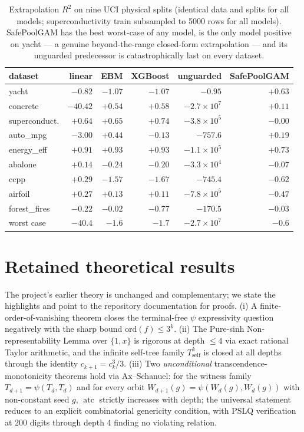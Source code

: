 \documentclass[11pt]{article}
\newcommand{\atc}{\operatorname{atc}}
\begin{document}
\begin{table}[t]
\centering\small
\begin{tabular}{lrrrrr}
\toprule
dataset & linear & EBM & XGBoost & unguarded & SafePoolGAM \\
\midrule
yacht            & $-0.82$  & $-1.07$ & $-1.07$ & $-0.95$            & $\mathbf{+0.63}$ \\
concrete         & $-40.42$ & $+0.54$ & $+0.58$ & $-2.7\times10^{7}$ & $+0.11$ \\
superconduct.    & $+0.64$  & $+0.65$ & $+0.74$ & $-3.8\times10^{5}$ & $-0.00$ \\
auto\_mpg        & $-3.00$  & $+0.44$ & $-0.13$ & $-757.6$           & $+0.19$ \\
energy\_eff      & $+0.91$  & $+0.93$ & $+0.93$ & $-1.1\times10^{5}$ & $+0.73$ \\
abalone          & $+0.14$  & $-0.24$ & $-0.20$ & $-3.3\times10^{4}$ & $-0.07$ \\
ccpp             & $+0.29$  & $-1.57$ & $-1.67$ & $-745.4$           & $-0.62$ \\
airfoil          & $+0.27$  & $+0.13$ & $+0.11$ & $-7.8\times10^{5}$ & $-0.47$ \\
forest\_fires    & $-0.22$  & $-0.02$ & $-0.77$ & $-170.5$           & $-0.03$ \\
\midrule
worst case       & $-40.4$  & $-1.6$  & $-1.7$  & $-2.7\times10^{7}$ & $\mathbf{-0.6}$ \\
\bottomrule
\end{tabular}
\caption{Extrapolation $R^2$ on nine UCI physical splits (identical
data and splits for all models; superconductivity train subsampled to
5000 rows for all models). SafePoolGAM has the best worst-case of any
model, is the only model positive on yacht — a genuine
beyond-the-range closed-form extrapolation — and its unguarded
predecessor is catastrophically last on every dataset.}
\label{tab:uci}
\end{table}

\section{Retained theoretical results}\label{sec:transcendence}

The project's earlier theory is unchanged and complementary; we state
the highlights and point to the repository documentation for proofs.
(i) A finite-order-of-vanishing theorem closes the terminal-free
$\psi$ expressivity question negatively with the sharp bound
$\mathrm{ord}(f)\le 3^k$. (ii) The Pure-sinh Non-representability
Lemma over $\{1,x\}$ is rigorous at depth $\le 4$ via exact rational
Taylor arithmetic, and the infinite self-tree family
$T^{k}_{\mathrm{self}}$ is closed at all depths through the identity
$c_{k+1}=c_k^3/3$. (iii) Two \emph{unconditional}
transcendence-monotonicity theorems hold via Ax--Schanuel: for the
witness family $T_{d+1}=\psi(T_d,T_d)$ and for every orbit
$W_{d+1}(g)=\psi(W_d(g),W_d(g))$ with non-constant seed $g$,
$\atc$ strictly increases with depth; the universal statement reduces
to an explicit combinatorial genericity condition, with PSLQ
verification at 200 digits through depth 4 finding no violating
relation.
\end{document}
